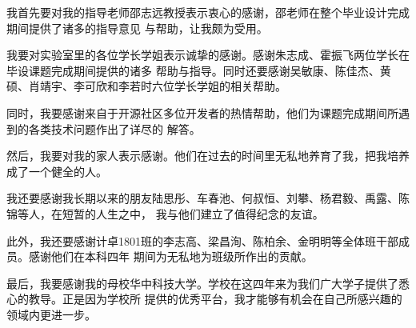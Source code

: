 \documentclass[supercite,notofont]{HustGraduPaper}
\begin{document}
\begin{thankpage}

我首先要对我的指导老师邵志远教授表示衷心的感谢，邵老师在整个毕业设计完成期间提供了诸多的指导意见
与帮助，让我颇为受用。

我要对实验室里的各位学长学姐表示诚挚的感谢。感谢朱志成、霍振飞两位学长在毕设课题完成期间提供的诸多
帮助与指导。同时还要感谢吴敏康、陈佳杰、黄硕、肖靖宇、李可欣和李若时六位学长学姐的相关帮助。

同时，我要感谢来自于开源社区多位开发者的热情帮助，他们为课题完成期间所遇到的各类技术问题作出了详尽的
解答。

然后，我要对我的家人表示感谢。他们在过去的时间里无私地养育了我，把我培养成了一个健全的人。

我还要感谢我长期以来的朋友陆思彤、车春池、何叔恒、刘攀、杨君毅、禹露、陈锦等人，在短暂的人生之中，
我与他们建立了值得纪念的友谊。

此外，我还要感谢计卓1801班的李志高、梁昌洵、陈柏余、金明明等全体班干部成员。感谢他们在本科四年
期间为无私地为班级所作出的贡献。

最后，我要感谢我的母校华中科技大学。学校在这四年来为我们广大学子提供了悉心的教导。正是因为学校所
提供的优秀平台，我才能够有机会在自己所感兴趣的领域内更进一步。

\end{thankpage}


\end{document}
